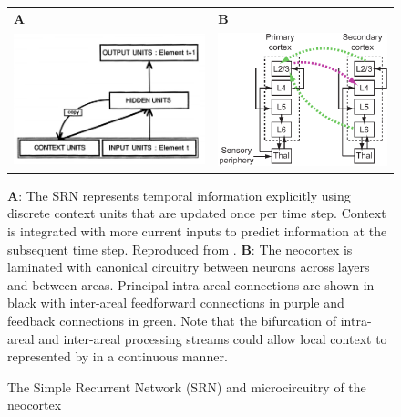 \documentclass[dwyatte_dissertation.tex]{subfiles}
\begin{document}
\begin{figure}[h!]
\begin{center}
\begin{tabular}{ll}
\textbf{A} & \textbf{B} \\
\includegraphics[width=85mm]{figs/chap_leabrati/srn_scm.png} &
\includegraphics[width=75mm]{figs/chap_leabrati/microcircuit_horiz.pdf} \\
\end{tabular}
\end{center}
\caption{The Simple Recurrent Network (SRN) and microcircuitry of the neocortex}{\textbf{A}: The SRN represents temporal information explicitly using discrete context units that are updated once per time step. Context is integrated with more current inputs to predict information at the subsequent time step. Reproduced from \protect{}. \textbf{B}: The neocortex is laminated with canonical circuitry between neurons across layers and between areas. Principal intra-areal connections are shown in black with inter-areal feedforward connections in purple and feedback connections in green. Note that the bifurcation of intra-areal and inter-areal processing streams could allow local context to represented by in a continuous manner.}
\label{fig:srn_circuit}
\end{figure}
\end{document}
